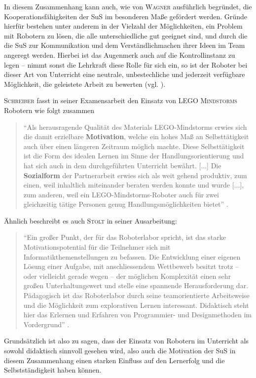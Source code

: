 \documentclass[paper=a4, DIV=14, BCOR=15mm, twoside=on, onecolumn=on, open = right, titlepage =on, parskip =half, headsepline = on, footsepline = on, chapterprefix = on, appendixprefix = off, fontsize = 12pt, numbers = noenddot, abstract = on]{scrbook}
\begin{document}
In diesem Zusammenhang kann auch, wie von \textsc{Wagner} ausführlich begründet, die Kooperationsfähigkeiten der SuS im besonderen Maße gefördert werden. Gründe hierfür bestehen unter anderem in der Vielzahl der Möglichkeiten, ein Problem mit Robotern zu lösen, die alle unterschiedliche gut geeignet sind, und durch die die SuS zur Kommunikation und dem Verständlichmachen ihrer Ideen im Team angeregt werden. Hierbei ist das Augenmerk auch auf die Kontrollinstanz zu legen -- nimmt sonst die Lehrkraft diese Rolle für sich ein, so ist der Roboter bei dieser Art von Unterricht eine neutrale, unbestechliche und jederzeit verfügbare Möglichkeit, die geleistete Arbeit zu bewerten (vgl. \cite[S.6f.]{wagner:05}).

\textsc{Schreiber} fasst in seiner Examensarbeit den Einsatz von \textsc{LEGO Mindstorms} Robotern wie folgt zusammen
\begin{quote}
"`Als herausragende Qualität des Materials LEGO-Mindstorms erwies sich die damit erzielbare \textbf{Motivation}, welche ein hohes Maß an Selbsttätigkeit auch über einen längeren Zeitraum möglich machte. Diese Selbsttätigkeit ist die Form des idealen Lernen im Sinne der Handlungsorientierung und hat sich auch in dem durchgeführten Unterricht bewährt. [...] Die \textbf{Sozialform} der Partnerarbeit erwies sich als weit gehend produktiv, zum einen, weil inhaltlich miteinander beraten werden konnte und wurde [...], zum anderen, weil ein LEGO-Mindstorms-Roboter auch für zwei gleichzeitig tätige Personen genug Handlungsmöglichkeiten bietet"' \cite[S.47f.]{schreiber:04}.
\end{quote}
Ähnlich beschreibt es auch \textsc{Stolt} in seiner Ausarbeitung:
\begin{quote}
"`Ein großer Punkt, der für das Roboterlabor spricht, ist das starke Motivationspotential für die Teilnehmer sich mit Informatikthemenstellungen zu befassen. Die Entwicklung einer eigenen Lösung einer Aufgabe, mit anschliessendem Wettbewerb besitzt trotz – oder vielleicht gerade wegen – der möglichen Komplexität einen sehr großen Unterhaltungswert und stelle eine spannende Herausforderung dar. Pädagogisch ist das Roboterlabor durch seine teamorientierte Arbeitsweise und die Möglichkeit zum explorativen Lernen interessant. Didaktisch steht hier das Erlernen und Erfahren von Programmier- und Designmethoden im Vordergrund"' \cite[S.5f.]{stolt:01}.
\end{quote}

Grundsätzlich ist also zu sagen, dass der Einsatz von Robotern im Unterricht als sowohl didaktisch sinnvoll gesehen wird, also auch die Motivation der SuS in diesem Zusammenhang einen starken Einfluss auf den Lernerfolg und die Selbstständigkeit haben können.\\
\end{document}

